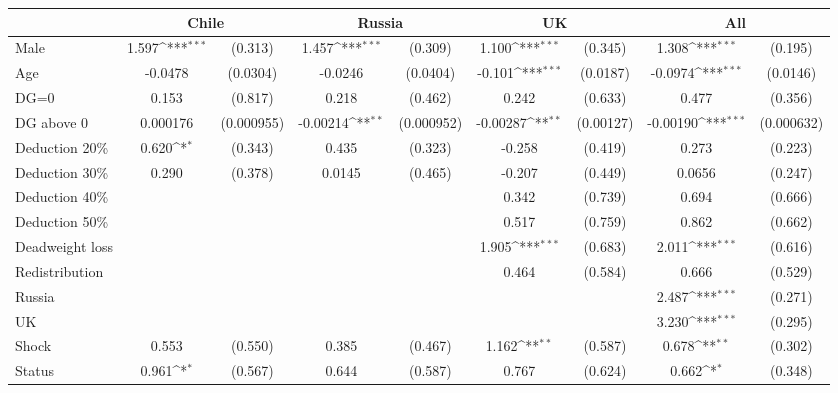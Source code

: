 {
\def\sym#1{\ifmmode^{#1}\else\(^{#1}\)\fi}
\begin{tabular}{l*{4}{cc}}
\hline\hline
                &\multicolumn{2}{c}{Chile}   &\multicolumn{2}{c}{Russia}  &\multicolumn{2}{c}{UK}      &\multicolumn{2}{c}{All}     \\
\hline
Male            &    1.597\sym{***}&  (0.313)&    1.457\sym{***}&  (0.309)&    1.100\sym{***}&  (0.345)&    1.308\sym{***}&  (0.195)\\
Age             &  -0.0478         & (0.0304)&  -0.0246         & (0.0404)&   -0.101\sym{***}& (0.0187)&  -0.0974\sym{***}& (0.0146)\\
DG=0            &    0.153         &  (0.817)&    0.218         &  (0.462)&    0.242         &  (0.633)&    0.477         &  (0.356)\\
DG above 0      & 0.000176         &(0.000955)& -0.00214\sym{**} &(0.000952)& -0.00287\sym{**} &(0.00127)& -0.00190\sym{***}&(0.000632)\\
Deduction 20\%  &    0.620\sym{*}  &  (0.343)&    0.435         &  (0.323)&   -0.258         &  (0.419)&    0.273         &  (0.223)\\
Deduction 30\%  &    0.290         &  (0.378)&   0.0145         &  (0.465)&   -0.207         &  (0.449)&   0.0656         &  (0.247)\\
Deduction 40\%  &                  &         &                  &         &    0.342         &  (0.739)&    0.694         &  (0.666)\\
Deduction 50\%  &                  &         &                  &         &    0.517         &  (0.759)&    0.862         &  (0.662)\\
Deadweight loss &                  &         &                  &         &    1.905\sym{***}&  (0.683)&    2.011\sym{***}&  (0.616)\\
Redistribution  &                  &         &                  &         &    0.464         &  (0.584)&    0.666         &  (0.529)\\
Russia          &                  &         &                  &         &                  &         &    2.487\sym{***}&  (0.271)\\
UK              &                  &         &                  &         &                  &         &    3.230\sym{***}&  (0.295)\\
Shock           &    0.553         &  (0.550)&    0.385         &  (0.467)&    1.162\sym{**} &  (0.587)&    0.678\sym{**} &  (0.302)\\
Status          &    0.961\sym{*}  &  (0.567)&    0.644         &  (0.587)&    0.767         &  (0.624)&    0.662\sym{*}  &  (0.348)\\

\end{tabular}}
